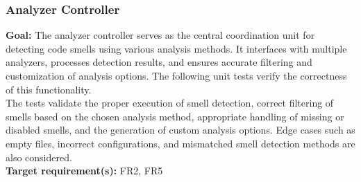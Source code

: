 \documentclass[12pt, titlepage]{article}
\begin{document}
  \subsubsection{Analyzer Controller}

  \textbf{Goal:} The analyzer controller serves as the central
  coordination unit for detecting code smells using various analysis
  methods. It interfaces with multiple analyzers, processes detection
  results, and ensures accurate filtering and customization of
  analysis options. The following unit tests verify the correctness
  of this functionality.\\

  \noindent The tests validate the proper execution of smell
  detection, correct filtering of smells based on the chosen analysis
  method, appropriate handling of missing or disabled smells, and the
  generation of custom analysis options. Edge cases such as empty
  files, incorrect configurations, and mismatched smell detection
  methods are also considered.\\

  \noindent\textbf{Target requirement(s):} FR2, FR5~\cite{SRS} \\
\end{document}
